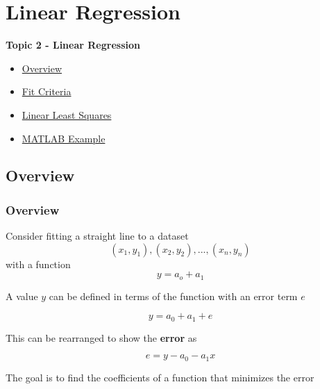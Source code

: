 \documentclass[fleqn]{beamer} %
\newcommand{\sectionIItitle}{Linear Regression}
\newcommand{\sectionIsubsectionIVtitle}{}
\newcommand{\sectionIIsubsectionItitle}{Overview}
\newcommand{\sectionIIsubsectionIItitle}{Fit Criteria}
\newcommand{\sectionIIsubsectionIIItitle}{Linear Least Squares}
\newcommand{\sectionIIsubsectionIVtitle}{MATLAB Example}
\begin{document}


	




	\section{\sectionIItitle}\label{sectionII}

		\begin{frame}
			\large \textbf{Topic 2 - \sectionIItitle} \vspace{3mm}\\

			\begin{itemize}
				\item \hyperlink{sectionIIsubsectionI}{\sectionIIsubsectionItitle} \vspc %
				\item \hyperlink{sectionIIsubsectionII}{\sectionIIsubsectionIItitle} \vspc %
				\item \hyperlink{sectionIIsubsectionIII}{\sectionIIsubsectionIIItitle} \vspc %
				\item \hyperlink{sectionIIsubsectionIV}{\sectionIIsubsectionIVtitle} \vspc %
			\end{itemize}

		\end{frame}

		\subsection{\sectionIIsubsectionItitle}\label{sectionIIsubsectionI}

			\begin{frame}[label=sectionIIsubsectionI]
				\frametitle{\sectionIIsubsectionItitle}
				\bigskip
        Consider fitting a straight line to a dataset
        \[(x_1, y_1), (x_2, y_2), ..., (x_n,y_n)\] 
        with a function \[y=a_o+a_1\]

        A value $y$ can be defined in terms of the function with an error term $e$

        \[y=a_0+a_1+e\]

        This can be rearranged to show the {\bf error} as

        \[e=y-a_0-a_1x\]
  
        The goal is to find the coefficients of a function that minimizes the error  
  
				\btVFill
			\end{frame}
\end{document}
